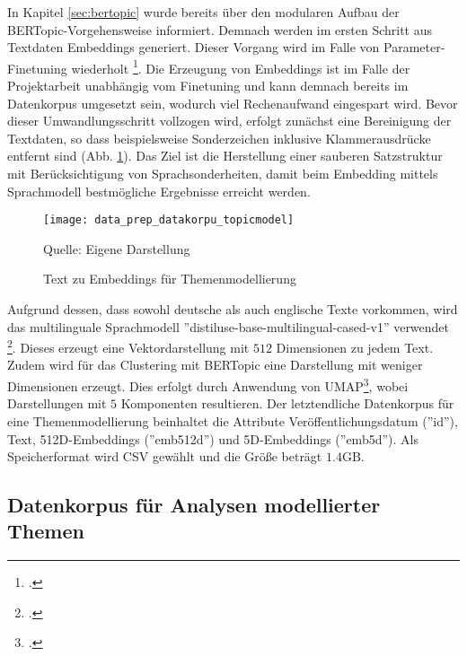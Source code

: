 In Kapitel \ref{sec:bertopic} wurde bereits über den modularen Aufbau der BERTopic-Vorgehensweise informiert. Demnach werden im ersten Schritt aus Textdaten Embeddings generiert. Dieser Vorgang wird im Falle von Parameter-Finetuning wiederholt \footcite{website:bertopic_bestpractices}. Die Erzeugung von Embeddings ist im Falle der Projektarbeit unabhängig vom Finetuning und kann demnach bereits im Datenkorpus umgesetzt sein, wodurch viel Rechenaufwand eingespart wird. Bevor dieser Umwandlungsschritt vollzogen wird, erfolgt zunächst eine Bereinigung der Textdaten, so dass beispielsweise Sonderzeichen inklusive Klammerausdrücke entfernt sind (Abb. \ref{fig:data_prep_datakorpu_topicmodel}). Das Ziel ist die Herstellung einer sauberen Satzstruktur mit Berücksichtigung von Sprachsonderheiten, damit beim Embedding mittels Sprachmodell bestmögliche Ergebnisse erreicht werden.
\begin{figure}[H]
	\centering
	\texttt{[image: data\_prep\_datakorpu\_topicmodel]}
	\caption{Text zu Embeddings für Themenmodellierung}
	\label{fig:data_prep_datakorpu_topicmodel}
	\vspace{0.5em}
	\raggedright
	\normalsize{Quelle: Eigene Darstellung}
	\vspace{-1.0em}
\end{figure}
Aufgrund dessen, dass sowohl deutsche als auch englische Texte vorkommen, wird das multilinguale Sprachmodell ''distiluse-base-multilingual-cased-v1'' verwendet \footcite{website:st_bert_models}. Dieses erzeugt eine Vektordarstellung mit $512$ Dimensionen zu jedem Text. Zudem wird für das Clustering mit BERTopic eine Darstellung mit weniger Dimensionen erzeugt. Dies erfolgt durch Anwendung von \ac{UMAP}\footcite{umap}, wobei Darstellungen mit $5$ Komponenten resultieren. Der letztendliche Datenkorpus für eine Themenmodellierung beinhaltet die Attribute Veröffentlichungsdatum (''id''), Text, 512D-Embeddings (''emb512d'') und 5D-Embeddings (''emb5d''). Als Speicherformat wird CSV gewählt und die Größe beträgt $1.4\text{GB}$.

\subsection{Datenkorpus für Analysen modellierter Themen}\label{sec:topic_modeling}

